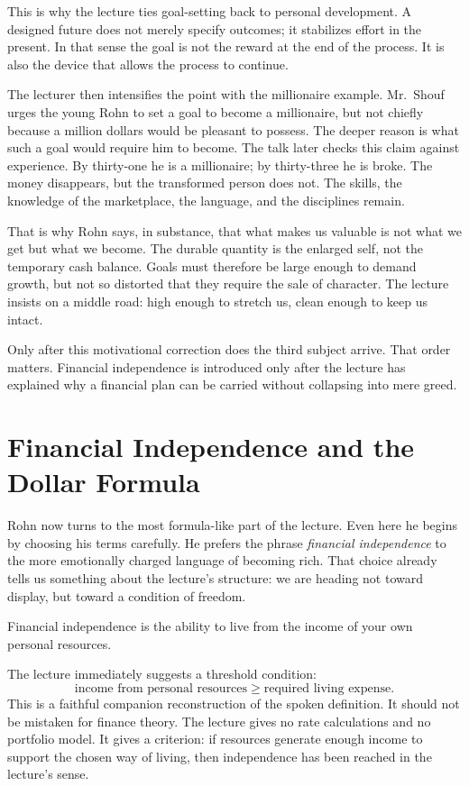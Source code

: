This is why the lecture ties goal-setting back to personal development. A designed future does not merely specify outcomes; it stabilizes effort in the present. In that sense the goal is not the reward at the end of the process. It is also the device that allows the process to continue.

The lecturer then intensifies the point with the millionaire example. Mr.~Shouf urges the young Rohn to set a goal to become a millionaire, but not chiefly because a million dollars would be pleasant to possess. The deeper reason is what such a goal would require him to become. The talk later checks this claim against experience. By thirty-one he is a millionaire; by thirty-three he is broke. The money disappears, but the transformed person does not. The skills, the knowledge of the marketplace, the language, and the disciplines remain.

That is why Rohn says, in substance, that what makes us valuable is not what we get but what we become. The durable quantity is the enlarged self, not the temporary cash balance. Goals must therefore be large enough to demand growth, but not so distorted that they require the sale of character. The lecture insists on a middle road: high enough to stretch us, clean enough to keep us intact.

Only after this motivational correction does the third subject arrive. That order matters. Financial independence is introduced only after the lecture has explained why a financial plan can be carried without collapsing into mere greed.

\section{Financial Independence and the Dollar Formula}

Rohn now turns to the most formula-like part of the lecture. Even here he begins by choosing his terms carefully. He prefers the phrase \emph{financial independence} to the more emotionally charged language of becoming rich. That choice already tells us something about the lecture's structure: we are heading not toward display, but toward a condition of freedom.

\begin{definition}
Financial independence is the ability to live from the income of your own personal resources.
\end{definition}

The lecture immediately suggests a threshold condition:
\begin{equation}
\text{income from personal resources} \ge \text{required living expense}.
\end{equation}
This is a faithful companion reconstruction of the spoken definition. It should not be mistaken for finance theory. The lecture gives no rate calculations and no portfolio model. It gives a criterion: if resources generate enough income to support the chosen way of living, then independence has been reached in the lecture's sense.

